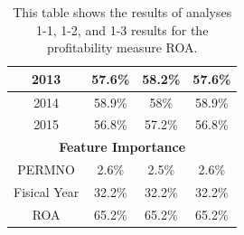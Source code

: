 {{\begin{table}[htb]
\begin{tabular}{cccc}
\multicolumn{1}{|c|}{2013}                           & \multicolumn{1}{c|}{57.6\%}              & \multicolumn{1}{c|}{58.2\%}                      & \multicolumn{1}{c|}{57.6\%}                        \\ \hline
\multicolumn{1}{|c|}{2014}                           & \multicolumn{1}{c|}{58.9\%}              & \multicolumn{1}{c|}{58\%}                        & \multicolumn{1}{c|}{58.9\%}                        \\ \hline
\multicolumn{1}{|c|}{2015}                           & \multicolumn{1}{c|}{56.8\%}              & \multicolumn{1}{c|}{57.2\%}                      & \multicolumn{1}{c|}{56.8\%}                        \\ \hline
\multicolumn{4}{|c|}{\textbf{Feature Importance}}                                                                                                                                                       \\ \hline
\multicolumn{1}{|c|}{PERMNO}                         & \multicolumn{1}{c|}{2.6\%}               & \multicolumn{1}{c|}{2.5\%}                       & \multicolumn{1}{c|}{2.6\%}                         \\ \hline
\multicolumn{1}{|c|}{Fisical Year}                   & \multicolumn{1}{c|}{32.2\%}              & \multicolumn{1}{c|}{32.2\%}                      & \multicolumn{1}{c|}{32.2\%}                        \\ \hline
\multicolumn{1}{|c|}{ROA}                            & \multicolumn{1}{c|}{65.2\%}              & \multicolumn{1}{c|}{65.2\%}                      & \multicolumn{1}{c|}{65.2\%}                        \\ \hline
\end{tabular}
\caption{This table shows the results of analyses 1-1, 1-2, and 1-3 results for the profitability measure ROA.}
\label{tab:ROA-1}
\end{table}


}}

